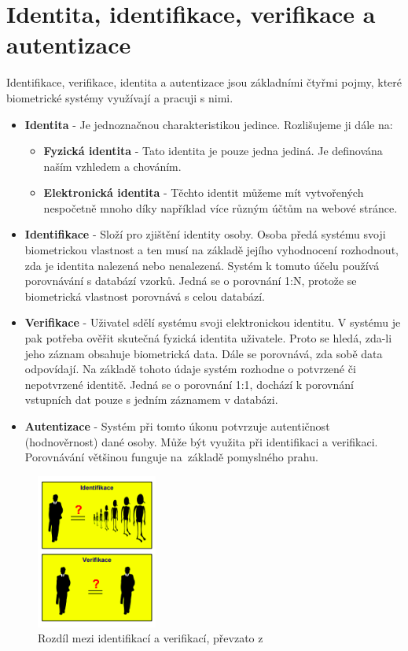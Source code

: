 \section{Identita, identifikace, verifikace a autentizace}
Identifikace, verifikace, identita a autentizace jsou základními čtyřmi pojmy, které biometrické systémy využívají a pracuji s nimi.\cite{Drahansky}
\begin{itemize}
    \item \textbf{Identita} - Je jednoznačnou charakteristikou jedince. Rozlišujeme ji dále na:
        \begin{itemize}
            \item \textbf{Fyzická identita} - Tato identita je pouze jedna jediná. Je definována naším vzhledem a chováním.
            \item \textbf{Elektronická identita} - Těchto identit můžeme mít vytvořených nespočetně mnoho díky například více různým účtům na webové stránce.
        \end{itemize}
    \item \textbf{Identifikace} - Složí pro zjištění identity osoby. Osoba předá systému svoji biometrickou vlastnost a ten musí na základě jejího vyhodnocení rozhodnout, zda je identita nalezená nebo nenalezená. Systém k tomuto účelu používá porovnávání s databází vzorků. Jedná se o porovnání 1:N, protože se biometrická vlastnost porovnává s celou databází.
    \item \textbf{Verifikace} - Uživatel sdělí systému svoji elektronickou identitu. V systému je pak potřeba ověřit skutečná fyzická identita uživatele. Proto se hledá, zda-li jeho záznam obsahuje biometrická data. Dále se porovnává, zda sobě data odpovídají. Na základě tohoto údaje systém rozhodne o potvrzené či nepotvrzené identitě. Jedná se o porovnání 1:1, dochází k porovnání vstupních dat pouze s jedním záznamem v databázi.
    \item \textbf{Autentizace} - Systém při tomto úkonu potvrzuje autentičnost (hodnověrnost) dané osoby. Může být využita při identifikaci a verifikaci. Porovnávání většinou funguje na~základě pomyslného prahu.
\end{itemize}

\begin{figure}[!htbp]
    \centering
    \includegraphics[width=150px]{obrazky-figures/identifver.png}
    \caption{Rozdíl mezi identifikací a verifikací, převzato z \cite{Drahansky}}
\end{figure}



